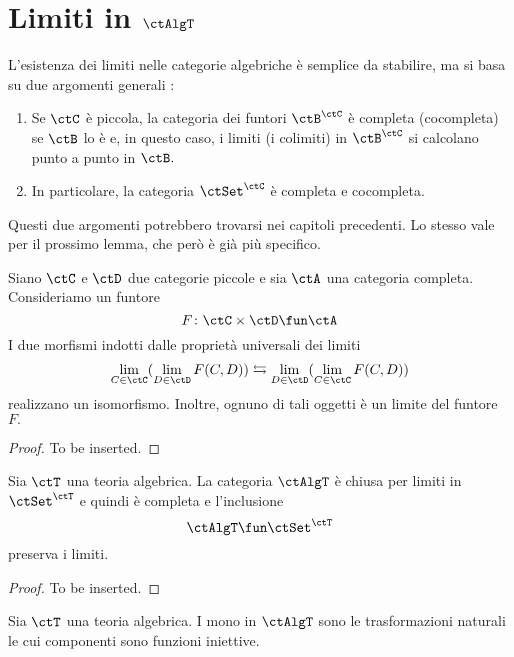 \section{Limiti in $\ctAlgT$}\label{sec_lim_AlgT}

\begin{warning}\label{caveat_lim_functcat}
L'esistenza dei limiti nelle categorie algebriche è semplice da stabilire, ma si basa su due argomenti generali :
\begin{enumerate}
\item Se $\ctC$ è piccola, la categoria dei funtori $\ctB^{\ctC}$ è completa (cocompleta) se $\ctB$ lo è e, in questo caso, i limiti (i
colimiti) in $\ctB^{\ctC}$ si calcolano punto a punto in $\ctB.$
\item In particolare, la categoria $\ctSet^{\ctC}$ è completa e cocompleta.
\end{enumerate}
Questi due argomenti potrebbero trovarsi nei capitoli precedenti. Lo stesso vale per il prossimo lemma, che però è già più specifico.
\end{warning} 

\begin{lemma}\label{lemma_Fubini}
Siano $\ctC$ e $\ctD$ due categorie piccole e sia $\ctA$ una categoria completa. Consideriamo un funtore
$$F \colon \ctC \times \ctD \fun \ctA$$
I due morfismi indotti dalle proprietà universali dei limiti
$$\lim_{C \in \ctC}(\lim_{D \in \ctD}F(C,D)) \leftrightarrows \lim_{D \in \ctD}(\lim_{C \in \ctC}F(C,D))$$
realizzano un isomorfismo. Inoltre, ognuno di tali oggetti è un limite del funtore $F.$
\end{lemma}

\begin{proof}
To be inserted.
\end{proof}

\begin{proposition}\label{prop_lim_AlgT}
Sia $\ctT$ una teoria algebrica. La categoria $\ctAlgT$ è chiusa per limiti in $\ctSet^{\ctT}$ e quindi è completa e l'inclusione
$$\ctAlgT \fun \ctSet^{\ctT}$$
preserva i limiti.
\end{proposition}

\begin{proof}
To be inserted.
\end{proof}

\begin{corollary}\label{cor_mono_AlgT}
Sia $\ctT$ una teoria algebrica. I mono in $\ctAlgT$ sono le trasformazioni naturali le cui componenti sono funzioni iniettive.
\end{corollary}

